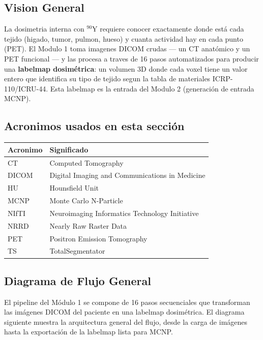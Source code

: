 \documentclass[12pt,a4paper]{article}
\begin{document}
\subsection{Vision General}

La dosimetria interna con $^{90}$Y requiere conocer exactamente donde está cada tejido (higado,
tumor, pulmon, hueso) y cuanta actividad hay en cada punto (PET). El Modulo 1 toma imagenes
DICOM crudas --- un CT anatómico y un PET funcional --- y las procesa a traves de 16 pasos
automatizados para producir una \textbf{labelmap dosimétrica}: un volumen 3D donde cada voxel
tiene un valor entero que identifica su tipo de tejido segun la tabla de materiales
ICRP-110/ICRU-44. Esta labelmap es la entrada del Modulo 2 (generación de entrada MCNP).

\subsection*{Acronimos usados en esta sección}
\begin{tabular}{ll}
\toprule
\textbf{Acronimo} & \textbf{Significado} \\
\midrule
CT & Computed Tomography \\
DICOM & Digital Imaging and Communications in Medicine \\
HU & Hounsfield Unit \\
MCNP & Monte Carlo N-Particle \\
NIfTI & Neuroimaging Informatics Technology Initiative \\
NRRD & Nearly Raw Raster Data \\
PET & Positron Emission Tomography \\
TS & TotalSegmentator \\
\bottomrule
\end{tabular}

\subsection{Diagrama de Flujo General}

El pipeline del Módulo 1 se compone de 16 pasos secuenciales que transforman las imágenes DICOM del paciente en una labelmap dosimétrica. El diagrama siguiente muestra la arquitectura general del flujo, desde la carga de imágenes hasta la exportación de la labelmap lista para MCNP.
\end{document}
